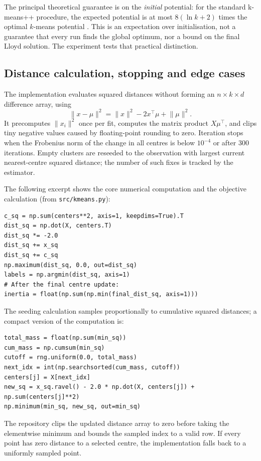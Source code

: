 \documentclass[10pt,a4paper]{article}
\begin{document}
The principal theoretical guarantee is on the \emph{initial} potential: for the standard k-means++ procedure, the expected potential is at most $8(\ln k+2)$ times the optimal $k$-means potential \cite{arthur2007kmeans}. This is an expectation over initialisation, not a guarantee that every run finds the global optimum, nor a bound on the final Lloyd solution. The experiment tests that practical distinction.

\subsection{Distance calculation, stopping and edge cases}
The implementation evaluates squared distances without forming an $n\times k\times d$ difference array, using
\[
\lVert x-\mu\rVert^2=\lVert x\rVert^2-2x^\top\mu+\lVert\mu\rVert^2.
\]
It precomputes $\lVert x_i\rVert^2$ once per fit, computes the matrix product $X\mu^\top$, and clips tiny negative values caused by floating-point rounding to zero. Iteration stops when the Frobenius norm of the change in all centres is below $10^{-4}$ or after 300 iterations. Empty clusters are reseeded to the observation with largest current nearest-centre squared distance; the number of such fixes is tracked by the estimator.

The following excerpt shows the core numerical computation and the objective calculation (from \texttt{src/kmeans.py}):
\begin{lstlisting}
c_sq = np.sum(centers**2, axis=1, keepdims=True).T
dist_sq = np.dot(X, centers.T)
dist_sq *= -2.0
dist_sq += x_sq
dist_sq += c_sq
np.maximum(dist_sq, 0.0, out=dist_sq)
labels = np.argmin(dist_sq, axis=1)
# After the final centre update:
inertia = float(np.sum(np.min(final_dist_sq, axis=1)))
\end{lstlisting}

The seeding calculation samples proportionally to cumulative squared distances; a compact version of the computation is:
\begin{lstlisting}
total_mass = float(np.sum(min_sq))
cum_mass = np.cumsum(min_sq)
cutoff = rng.uniform(0.0, total_mass)
next_idx = int(np.searchsorted(cum_mass, cutoff))
centers[j] = X[next_idx]
new_sq = x_sq.ravel() - 2.0 * np.dot(X, centers[j]) + np.sum(centers[j]**2)
np.minimum(min_sq, new_sq, out=min_sq)
\end{lstlisting}
The repository clips the updated distance array to zero before taking the elementwise minimum and bounds the sampled index to a valid row. If every point has zero distance to a selected centre, the implementation falls back to a uniformly sampled point.
\end{document}
